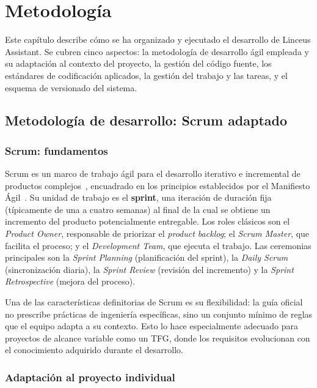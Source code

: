 \chapter{Metodología}
\label{cap:metodologia}

Este capítulo describe cómo se ha organizado y ejecutado el desarrollo de Linceus Assistant. Se cubren cinco aspectos: la metodología de desarrollo ágil empleada y su adaptación al contexto del proyecto, la gestión del código fuente, los estándares de codificación aplicados, la gestión del trabajo y las tareas, y el esquema de versionado del sistema.

\section{Metodología de desarrollo: Scrum adaptado}
\label{sec:scrum}

\subsection{Scrum: fundamentos}

Scrum es un marco de trabajo ágil para el desarrollo iterativo e incremental de productos complejos~\cite{schwaber2020scrum}, encuadrado en los principios establecidos por el Manifiesto Ágil~\cite{beck2001agile}. Su unidad de trabajo es el \textbf{sprint}, una iteración de duración fija (típicamente de una a cuatro semanas) al final de la cual se obtiene un incremento del producto potencialmente entregable. Los roles clásicos son el \textit{Product Owner}, responsable de priorizar el \textit{product backlog}; el \textit{Scrum Master}, que facilita el proceso; y el \textit{Development Team}, que ejecuta el trabajo. Las ceremonias principales son la \textit{Sprint Planning} (planificación del sprint), la \textit{Daily Scrum} (sincronización diaria), la \textit{Sprint Review} (revisión del incremento) y la \textit{Sprint Retrospective} (mejora del proceso).

Una de las características definitorias de Scrum es su flexibilidad: la guía oficial no prescribe prácticas de ingeniería específicas, sino un conjunto mínimo de reglas que el equipo adapta a su contexto. Esto lo hace especialmente adecuado para proyectos de alcance variable como un TFG, donde los requisitos evolucionan con el conocimiento adquirido durante el desarrollo.

\subsection{Adaptación al proyecto individual}

